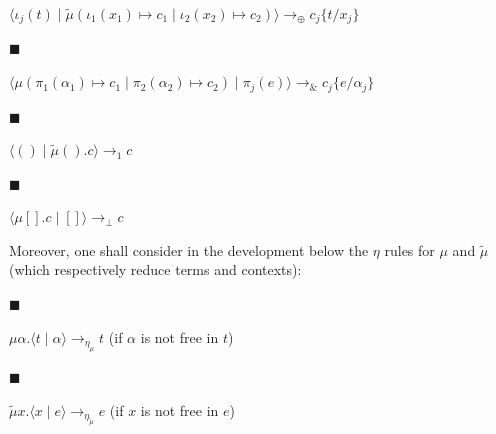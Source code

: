 \documentclass[10pt,a4paper]{article}
\newcommand{\binampersand}{\mathbin{\&}}
\begin{document}
$\langle\iota_{j}(t)\mid\tilde{\mu}(\iota_{1}(x_{1})\mapsto c_{1}\mid\iota_{2}(x_{2})\mapsto c_{2})\rangle\longrightarrow_{\oplus}c_{j}\{t/x_{j}\}$\par
 
 
 
\par\noindent  $\blacksquare$ 
 
$\langle\mu(\pi_{1}(\alpha_{1})\mapsto c_{1}\mid\pi_{2}(\alpha_{2})\mapsto c_{2})\mid\pi_{j}(e)\rangle\longrightarrow_{\binampersand}c_{j}\{e/\alpha_{j}\}$\par
 
 
 
\par\noindent  $\blacksquare$ 
 
$\langle()\mid\tilde{\mu}().c\rangle\longrightarrow_{1}c$\par
 
 
 
\par\noindent  $\blacksquare$ 
 
$\langle\mu[].c\mid[]\rangle\longrightarrow_{\bot}c$\par
 
 
  
 
 
Moreover, one shall consider in the development below the $\eta$ rules for $\mu$ and $\tilde{\mu}$ (which respectively reduce terms and contexts):\par
  
\par\noindent  $\blacksquare$ 
 
${\mu\alpha.\langle t\mid\alpha\rangle}\longrightarrow_{\eta_{\mu}}t$ (if $\alpha$ is not free in $t$)\par
 
 
 
\par\noindent  $\blacksquare$ 
 
${\tilde{\mu}x.\langle x\mid e\rangle}\longrightarrow_{\eta_{\tilde{\mu}}}e$ (if $x$ is not free in $e$)\par
 
 
  
 
 
\end{document}
